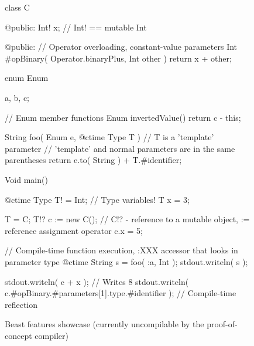 \documentclass{ExcelAtFIT}
\begin{document}




\begin{figure}[tbh]
	\begin{code}
class C {
	
@public:
	Int! x; // Int! == mutable Int
	
@public:
	// Operator overloading, constant-value parameters
	Int #opBinary(
		Operator.binaryPlus,
		Int other
		)
	{
		return x + other;
	}
	
}

enum Enum {
	a, b, c;
	
	// Enum member functions
	Enum invertedValue() {
		return c - this;	
	}
}

String foo( Enum e, @ctime Type T ) {
	// T is a 'template' parameter
	// 'template' and normal parameters are in the same parentheses
	return e.to( String ) + T.#identifier; 
}

Void main() {
	@ctime Type T! = Int; // Type variables!
	T x = 3;
	
	T = C;
	T!? c := new C(); // C!? - reference to a mutable object, := reference assignment operator
	c.x = 5;
	
	// Compile-time function execution, :XXX accessor that looks in parameter type
	@ctime String s = foo( :a, Int );
	stdout.writeln( s );
	
	stdout.writeln( c + x ); // Writes 8
	stdout.writeln( c.#opBinary.#parameters[1].type.#identifier ); // Compile-time reflection
}
	\end{code}
	\caption{Beast features showcase (currently uncompilable by the proof-of-concept compiler)}
	\label{fig:beastShowcase}
\end{figure}
\end{document}
